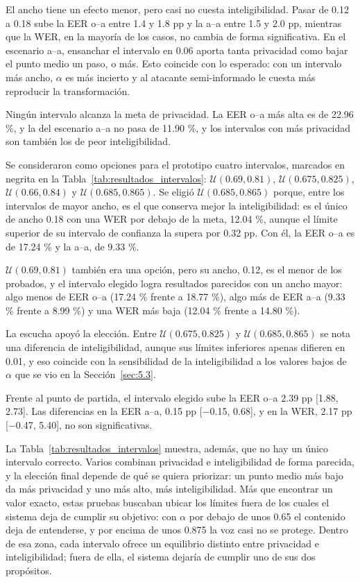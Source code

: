 \documentclass[10pt,twocolumn]{article}
\begin{document}
El ancho tiene un efecto menor, pero casi no cuesta inteligibilidad. Pasar de 0.12 a 0.18 sube la EER o--a entre 1.4 y 1.8 pp y la a--a entre 1.5 y 2.0 pp, mientras que la WER, en la mayoría de los casos, no cambia de forma significativa. En el escenario a--a, ensanchar el intervalo en 0.06 aporta tanta privacidad como bajar el punto medio un paso, o más. Esto coincide con lo esperado: con un intervalo más ancho, $\alpha$ es más incierto y al atacante semi-informado le cuesta más reproducir la transformación.

Ningún intervalo alcanza la meta de privacidad. La EER o--a más alta es de 22.96 \%, y la del escenario a--a no pasa de 11.90 \%, y los intervalos con más privacidad son también los de peor inteligibilidad.

Se consideraron como opciones para el prototipo cuatro intervalos, marcados en negrita en la Tabla~\ref{tab:resultados_intervalos}: $\mathcal{U}(0.69, 0.81)$, $\mathcal{U}(0.675, 0.825)$, $\mathcal{U}(0.66, 0.84)$ y $\mathcal{U}(0.685, 0.865)$. Se eligió $\mathcal{U}(0.685, 0.865)$ porque, entre los intervalos de mayor ancho, es el que conserva mejor la inteligibilidad: es el único de ancho 0.18 con una WER por debajo de la meta, 12.04 \%, aunque el límite superior de su intervalo de confianza la supera por 0.32 pp. Con él, la EER o--a es de 17.24 \% y la a--a, de 9.33 \%.

$\mathcal{U}(0.69, 0.81)$ también era una opción, pero su ancho, 0.12, es el menor de los probados, y el intervalo elegido logra resultados parecidos con un ancho mayor: algo menos de EER o--a (17.24 \% frente a 18.77 \%), algo más de EER a--a (9.33 \% frente a 8.99 \%) y una WER más baja (12.04 \% frente a 14.80 \%).

La escucha apoyó la elección. Entre $\mathcal{U}(0.675, 0.825)$ y $\mathcal{U}(0.685, 0.865)$ se nota una diferencia de inteligibilidad, aunque sus límites inferiores apenas difieren en 0.01, y eso coincide con la sensibilidad de la inteligibilidad a los valores bajos de $\alpha$ que se vio en la Sección~\ref{sec:5.3}.

Frente al punto de partida, el intervalo elegido sube la EER o--a 2.39 pp [1.88, 2.73]. Las diferencias en la EER a--a, 0.15 pp [$-$0.15, 0.68], y en la WER, 2.17 pp [$-$0.47, 5.40], no son significativas.

La Tabla~\ref{tab:resultados_intervalos} muestra, además, que no hay un único intervalo correcto. Varios combinan privacidad e inteligibilidad de forma parecida, y la elección final depende de qué se quiera priorizar: un punto medio más bajo da más privacidad y uno más alto, más inteligibilidad. Más que encontrar un valor exacto, estas pruebas buscaban ubicar los límites fuera de los cuales el sistema deja de cumplir su objetivo: con $\alpha$ por debajo de unos 0.65 el contenido deja de entenderse, y por encima de unos 0.875 la voz casi no se protege. Dentro de esa zona, cada intervalo ofrece un equilibrio distinto entre privacidad e inteligibilidad; fuera de ella, el sistema dejaría de cumplir uno de sus dos propósitos.
\end{document}
